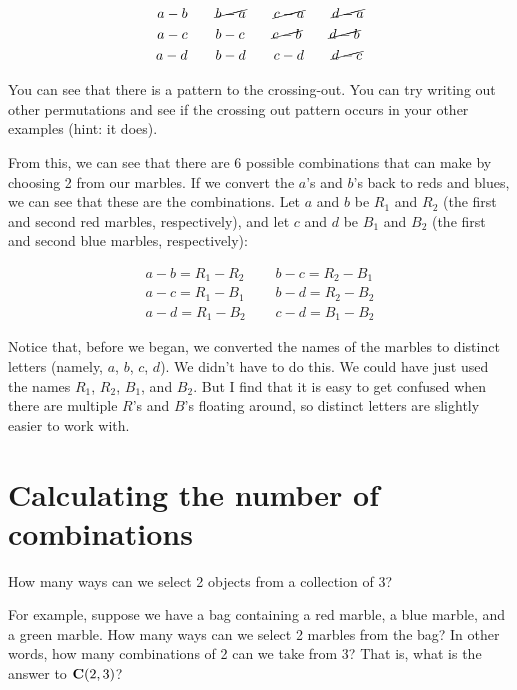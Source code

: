 \documentclass[../../../main.tex]{subfiles}
\begin{document}
\begin{align*}
  a-b ~~~~~~ &\cancel{b-a} ~~~~~~ \cancel{c-a} ~~~~~~ \cancel{d-a} \\
  a-c ~~~~~~ &b-c ~~~~~~ \cancel{c-b} ~~~~~~ \cancel{d-b} \\
  a-d ~~~~~~ &b-d ~~~~~~ c-d ~~~~~~ \cancel{d-c} 
\end{align*}

\noindent
You can see that there is a pattern to the crossing-out. You can try writing out other permutations and see if the crossing out pattern occurs in your other examples (hint: it does).

From this, we can see that there are 6 possible combinations that can make by choosing 2 from our marbles. If we convert the $a$'s and $b$'s back to reds and blues, we can see that these are the combinations. Let $a$ and $b$ be $R_{1}$ and $R_{2}$ (the first and second red marbles, respectively), and let $c$ and $d$ be $B_{1}$ and $B_{2}$ (the first and second blue marbles, respectively):

\begin{align*}
  a-b = R_{1}-R_{2} ~~~~~~ &b-c = R_{2}-B_{1} \\
  a-c = R_{1}-B_{1} ~~~~~~ &b-d = R_{2}-B_{2} \\
  a-d = R_{1}-B_{2} ~~~~~~ &c-d = B_{1}-B_{2}
\end{align*}

\noindent
Notice that, before we began, we converted the names of the marbles to distinct letters (namely, $a$, $b$, $c$, $d$). We didn't have to do this. We could have just used the names $R_{1}$, $R_{2}$, $B_{1}$, and $B_{2}$. But I find that it is easy to get confused when there are multiple $R$'s and $B$'s floating around, so distinct letters are slightly easier to work with.


\section{Calculating the number of combinations}

How many ways can we select 2 objects from a collection of 3? 

For example, suppose we have a bag containing a red marble, a blue marble, and a green marble. How many ways can we select 2 marbles from the bag? In other words, how many combinations of 2 can we take from 3? That is, what is the answer to $\mathbf{C}(2, 3)$?
\end{document}
